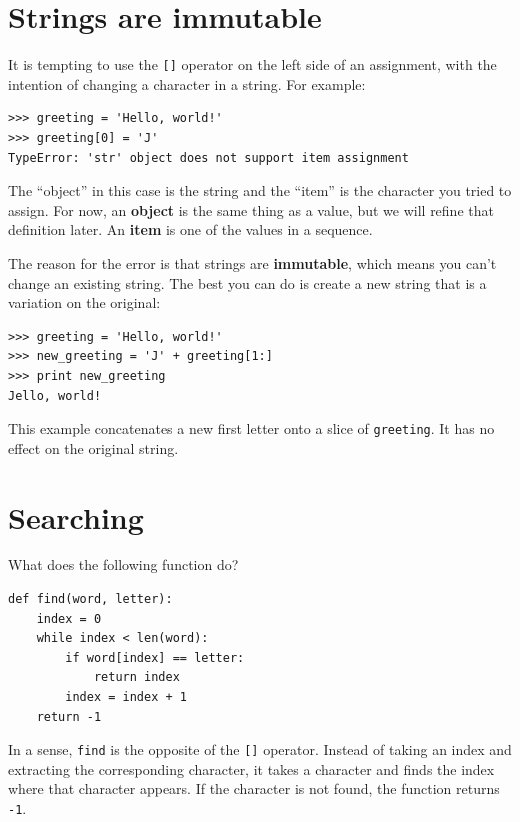\documentclass[10pt]{book}
\begin{document}
\section{Strings are immutable}

It is tempting to use the {\tt []} operator on the left side of an
assignment, with the intention of changing a character in a string.
For example:

\begin{verbatim}
>>> greeting = 'Hello, world!'
>>> greeting[0] = 'J'
TypeError: 'str' object does not support item assignment
\end{verbatim}
%
The ``object'' in this case is the string and the ``item'' is
the character you tried to assign.  For now, an {\bf object} is
the same thing as a value, but we will refine that definition
later.  An {\bf item} is one of the values in a sequence.

The reason for the error is that
strings are {\bf immutable}, which means you can't change an
existing string.  The best you can do is create a new string
that is a variation on the original:

\begin{verbatim}
>>> greeting = 'Hello, world!'
>>> new_greeting = 'J' + greeting[1:]
>>> print new_greeting
Jello, world!
\end{verbatim}
%
This example concatenates a new first letter onto
a slice of {\tt greeting}.  It has no effect on
the original string.


\section{Searching}
\label{find}

What does the following function do?

\begin{verbatim}
def find(word, letter):
    index = 0
    while index < len(word):
        if word[index] == letter:
            return index
        index = index + 1
    return -1
\end{verbatim}
%
In a sense, {\tt find} is the opposite of the {\tt []} operator.
Instead of taking an index and extracting the corresponding character,
it takes a character and finds the index where that character
appears.  If the character is not found, the function returns {\tt
-1}.
\end{document}
